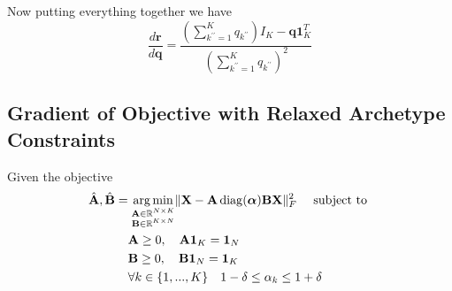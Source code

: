 \documentclass[oneside]{article}
\DeclareMathOperator*{\argmin}{arg\,min}
\begin{document}
Now putting everything together we have
\begin{equation}
    \frac{d \mathbf{r}}{d \mathbf{q}} =
    \frac{\left( \sum_{k^{\prime \prime}=1}^K {q}_{k^{\prime \prime}}\right) I_K - \mathbf{q} \mathbf{1}_K^T}{\left(\sum_{k^{\prime \prime}=1}^K {q}_{k^{\prime \prime}} \right)^{2}}
\end{equation}

\subsection{Gradient of Objective with Relaxed Archetype Constraints}
\label{subsec:relaxed_objective_grad}

Given the objective
\begin{equation}
\label{eq:relaxed_objective_standard}
    \begin{aligned}
        \hat{\mathbf{A}}, \hat{\mathbf{B}} =& \; \underset{\begin{subarray}{c} \mathbf{A} \in \mathbb{R}^{N \times K} \\
        \mathbf{B} \in \mathbb{R}^{K \times N} \end{subarray}}{\argmin}
        \| {\mathbf{X}} - {\mathbf{A}} \operatorname{diag}(\boldsymbol{\alpha}) \mathbf{B} \mathbf{X}\|_F^2 \quad \text{ subject to } \\
        & \mathbf{A} \geq 0, \quad \mathbf{A} \mathbf{1}_K = \mathbf{1}_N \\
        & \mathbf{B} \geq 0, \quad \mathbf{B} \mathbf{1}_N = \mathbf{1}_K \\
        & \forall k \in \{1, ..., K\} \quad 1 - \delta \leq \alpha_k \leq 1 + \delta
    \end{aligned}
\end{equation}
\end{document}
